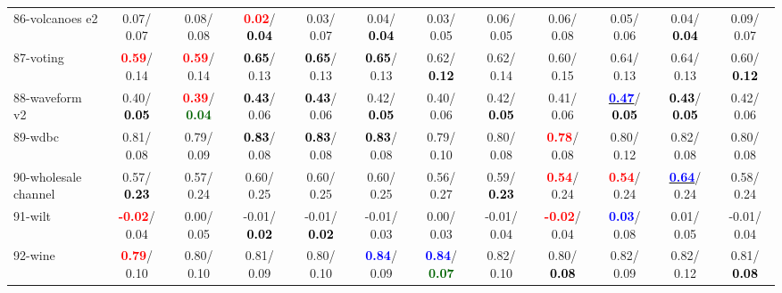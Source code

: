 \begin{table}[h]
\begin{center}
{\begin{tabular}{lc|c|c|c|c|c|c|c|c|c|c}
86-volcanoes e2 &   0.07/  0.07 &   0.08/  0.08 & \textcolor{red}{\textbf{  0.02}}/\textcolor{black}{\textbf{  0.04}} &   0.03/  0.07 &   0.04/\textcolor{black}{\textbf{  0.04}} &   0.03/  0.05 &   0.06/  0.05 &   0.06/  0.08 &   0.05/  0.06 &   0.04/\textcolor{black}{\textbf{  0.04}} &   0.09/  0.07 \\
87-voting & \textcolor{red}{\textbf{  0.59}}/  0.14 & \textcolor{red}{\textbf{  0.59}}/  0.14 & \textcolor{black}{\textbf{  0.65}}/  0.13 & \textcolor{black}{\textbf{  0.65}}/  0.13 & \textcolor{black}{\textbf{  0.65}}/  0.13 &   0.62/\textcolor{black}{\textbf{  0.12}} &   0.62/  0.14 &   0.60/  0.15 &   0.64/  0.13 &   0.64/  0.13 &   0.60/\textcolor{black}{\textbf{  0.12}} \\
88-waveform v2 &   0.40/\textcolor{black}{\textbf{  0.05}} & \textcolor{red}{\textbf{  0.39}}/\textcolor{darkgreen}{\textbf{  0.04}} & \textcolor{black}{\textbf{  0.43}}/  0.06 & \textcolor{black}{\textbf{  0.43}}/  0.06 &   0.42/\textcolor{black}{\textbf{  0.05}} &   0.40/  0.06 &   0.42/\textcolor{black}{\textbf{  0.05}} &   0.41/  0.06 & \underline{\textcolor{blue}{\textbf{  0.47}}}/\textcolor{black}{\textbf{  0.05}} & \textcolor{black}{\textbf{  0.43}}/\textcolor{black}{\textbf{  0.05}} &   0.42/  0.06 \\
89-wdbc &   0.81/  0.08 &   0.79/  0.09 & \textcolor{black}{\textbf{  0.83}}/  0.08 & \textcolor{black}{\textbf{  0.83}}/  0.08 & \textcolor{black}{\textbf{  0.83}}/  0.08 &   0.79/  0.10 &   0.80/  0.08 & \textcolor{red}{\textbf{  0.78}}/  0.08 &   0.80/  0.12 &   0.82/  0.08 &   0.80/  0.08 \\
90-wholesale channel &   0.57/\textcolor{black}{\textbf{  0.23}} &   0.57/  0.24 &   0.60/  0.25 &   0.60/  0.25 &   0.60/  0.25 &   0.56/  0.27 &   0.59/\textcolor{black}{\textbf{  0.23}} & \textcolor{red}{\textbf{  0.54}}/  0.24 & \textcolor{red}{\textbf{  0.54}}/  0.24 & \underline{\textcolor{blue}{\textbf{  0.64}}}/  0.24 &   0.58/  0.24 \\
91-wilt & \textcolor{red}{\textbf{ -0.02}}/  0.04 &   0.00/  0.05 &  -0.01/\textcolor{black}{\textbf{  0.02}} &  -0.01/\textcolor{black}{\textbf{  0.02}} &  -0.01/  0.03 &   0.00/  0.03 &  -0.01/  0.04 & \textcolor{red}{\textbf{ -0.02}}/  0.04 & \textcolor{blue}{\textbf{  0.03}}/  0.08 &   0.01/  0.05 &  -0.01/  0.04 \\
92-wine & \textcolor{red}{\textbf{  0.79}}/  0.10 &   0.80/  0.10 &   0.81/  0.09 &   0.80/  0.10 & \textcolor{blue}{\textbf{  0.84}}/  0.09 & \textcolor{blue}{\textbf{  0.84}}/\textcolor{darkgreen}{\textbf{  0.07}} &   0.82/  0.10 &   0.80/\textcolor{black}{\textbf{  0.08}} &   0.82/  0.09 &   0.82/  0.12 &   0.81/\textcolor{black}{\textbf{  0.08}} \\ \hline

\end{tabular}}
\end{center}
\end{table}
